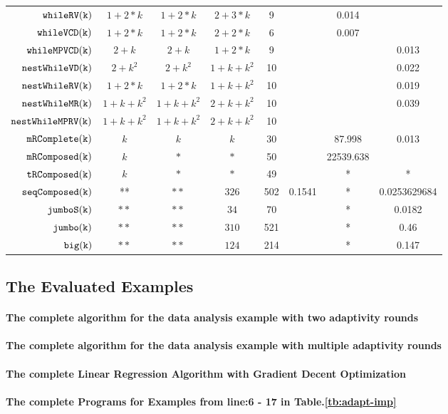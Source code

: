{\begin {table}[H]
\begin{center}
{\begin{tabular}{ r | c | c | c | c | c | c | c  }
         $  \mathtt{whileRV(k)}$ & $1 + 2*k$ &  $1 + 2*k$ & $2 + 3 * k$  &  9 & & 0.014  \\
         $  \mathtt{whileVCD(k)}$ & $1 + 2*k$ &   $1 + 2 * k$ & $2 + 2 * k$  &  6 & & 0.007  \\
         $  \mathtt{whileMPVCD(k)}$ & $2 + k$ &  $2 + k$ & $1 + 2 * k$   &   9 & & & 0.013 \\
         $  \mathtt{nestWhileVD(k)}$ & $2 + k^2$ &   $2 + k^2$ & $1 + k + k^2$   &  10 &  & & 0.022  \\
         $  \mathtt{nestWhileRV(k)}$ & $1 + 2*k$ &   $1 + 2*k$ &  $1 + k + k^2$   &  10 & & & 0.019  \\
         $  \mathtt{nestWhileMR(k)}$ & $1 + k + k^2$ & $1 + k + k^2$ &  $2 + k + k^2$  & 10 & & & 0.039  \\
         $  \mathtt{nestWhileMPRV(k)}$ & $1 + k + k^2$ &  $1 + k + k^2$ &  $2 + k + k^2$  &  10 & & &  \\
         $  \mathtt{mRComplete(k)}$ & $k$ & $k$ & $k$   &  30 & & 87.998 & 0.013 \\
         $  \mathtt{mRComposed(k)}$ & $k$ & $*$ & $*$   &  50 & & 22539.638\\
         $  \mathtt{tRComposed(k)}$ & $k$ &  $*$ & $*$  &  49 & & * & *\\
         $  \mathtt{seqComposed(k)}$ & ** & $**$ & $326$  &  502 & 0.1541 & *  & 0.0253629684\\
         $  \mathtt{jumboS(k)}$ & $**$ & $**$ & $34$  &  70 & & * &  0.0182 \\
         $  \mathtt{jumbo(k)}$ & $**$ &  $**$ & $310$  &  521 & & * & 0.46\\
         $  \mathtt{big(k)}$ & $**$ &  $**$ & $124$  &  214 & & * & 0.147
        \end{tabular}
}        
\end{center}
\end{table}
}

 \subsection{The Evaluated Examples}  
 \paragraph{The complete algorithm for the data analysis example with two adaptivity rounds} 
 
 \paragraph{The complete algorithm for the data analysis example with multiple adaptivity rounds} 
 
\paragraph{The complete Linear Regression Algorithm with Gradient Decent Optimization}

\paragraph*{The complete Programs for Examples from line:6 - 17 in Table.\ref{tb:adapt-imp}}

